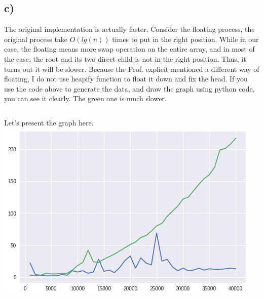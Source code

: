 \documentclass{article}
\begin{document}
\subsection*{c)}
The original implementation is actually faster.
Consider the floating process, the original process take $O(lg(n))$ times to put in
the right position. While in our case, the floating means more swap operation on the entire array,
and in most of the case, the root and its two direct child
is not in the right position. Thus, it turns out it will
be slower. 
Because the Prof. explicit mentioned a different way of floating,
I do not use heapify function to float it down and fix the head.
If you use the code above to generate the data, and draw the graph using python code,
you can see it clearly. The green one is much slower.
\inputminted{Python}{draw.py}
Let's present the graph here. \\
\includegraphics{draw.png}
\end{document}
